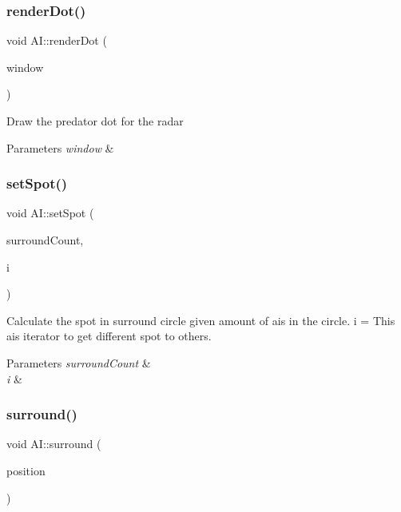 \subsubsection{\texorpdfstring{renderDot()}{renderDot()}}
{\footnotesize\ttfamily void A\+I\+::render\+Dot (\begin{DoxyParamCaption}\item[{sf\+::\+Render\+Window \&}]{window }\end{DoxyParamCaption})}



Draw the predator dot for the radar 


\begin{DoxyParams}{Parameters}
{\em window} & \\
\hline
\end{DoxyParams}
\mbox{\label{class_a_i_a128f8cf306126950c7085f582ed671c5}} 
\subsubsection{\texorpdfstring{setSpot()}{setSpot()}}
{\footnotesize\ttfamily void A\+I\+::set\+Spot (\begin{DoxyParamCaption}\item[{int}]{surround\+Count,  }\item[{int}]{i }\end{DoxyParamCaption})}



Calculate the spot in surround circle given amount of ais in the circle. i = This ais iterator to get different spot to others. 


\begin{DoxyParams}{Parameters}
{\em surround\+Count} & \\
\hline
{\em i} & \\
\hline
\end{DoxyParams}
\mbox{\label{class_a_i_a14ec51b0b964c0e75c7c7ec2ee4829e4}} 
\subsubsection{\texorpdfstring{surround()}{surround()}}
{\footnotesize\ttfamily void A\+I\+::surround (\begin{DoxyParamCaption}\item[{sf\+::\+Vector2f}]{position }\end{DoxyParamCaption})}



